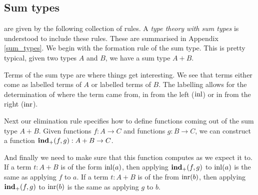 \subsection{Sum types}

\begin{defin}
     are given by the following collection of rules. A \emph{type theory with sum types} is understood to include these rules. These are summarised in Appendix \ref{sum_types}. 
    We begin with the formation rule of the sum type. This is pretty typical, given two types $A$ and $B$, we have a sum type $A + B$.
    \begin{prooftree}
    \end{prooftree}

    Terms of the sum type are where things get interesting. We see that terms either come as labelled terms of $A$ or labelled terms of $B$. The labelling allows for the determination of where the term came from, in from the left ($\inl$) or in from the right ($\inr$).

    \begin{prooftree}
    \end{prooftree}

    \begin{prooftree}
    \end{prooftree}

    Next our elimination rule specifies how to define functions coming out of the sum type $A + B$. Given functions $f : A \to C$ and functions $g : B \to C$, we can construct a function $\indp(f,g) : A + B \to C$.

    \begin{prooftree}
    \end{prooftree}

    And finally we need to make sure that this function computes as we expect it to. If a term $t : A + B$ is of the form $\inl(a)$, then applying $\indp(f, g)$ to $\inl(a)$ is the same as applying $f$ to $a$. If a term $t : A + B$ is of the from $\inr(b)$, then applying $\indp (f, g)$ to $\inr (b)$ is the same as applying $g$ to $b$.


\end{defin}
